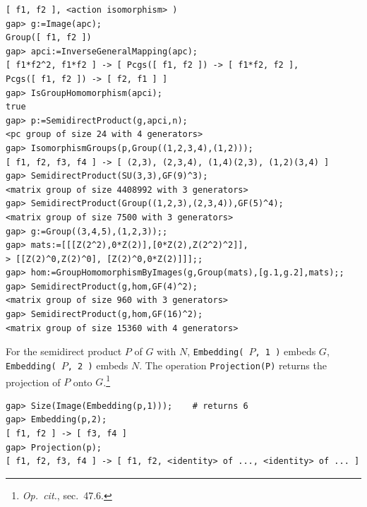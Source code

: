 \begin{itemize}
{\begin{verbatim}
[ f1, f2 ], <action isomorphism> )
gap> g:=Image(apc);
Group([ f1, f2 ])
gap> apci:=InverseGeneralMapping(apc);
[ f1*f2^2, f1*f2 ] -> [ Pcgs([ f1, f2 ]) -> [ f1*f2, f2 ],
Pcgs([ f1, f2 ]) -> [ f2, f1 ] ]
gap> IsGroupHomomorphism(apci);
true
gap> p:=SemidirectProduct(g,apci,n);
<pc group of size 24 with 4 generators>
gap> IsomorphismGroups(p,Group((1,2,3,4),(1,2)));
[ f1, f2, f3, f4 ] -> [ (2,3), (2,3,4), (1,4)(2,3), (1,2)(3,4) ]
gap> SemidirectProduct(SU(3,3),GF(9)^3);
<matrix group of size 4408992 with 3 generators>
gap> SemidirectProduct(Group((1,2,3),(2,3,4)),GF(5)^4);
<matrix group of size 7500 with 3 generators>
gap> g:=Group((3,4,5),(1,2,3));;
gap> mats:=[[[Z(2^2),0*Z(2)],[0*Z(2),Z(2^2)^2]],
> [[Z(2)^0,Z(2)^0], [Z(2)^0,0*Z(2)]]];;
gap> hom:=GroupHomomorphismByImages(g,Group(mats),[g.1,g.2],mats);;
gap> SemidirectProduct(g,hom,GF(4)^2);
<matrix group of size 960 with 3 generators>
gap> SemidirectProduct(g,hom,GF(16)^2);
<matrix group of size 15360 with 4 generators>
\end{verbatim}}
\noindent For the semidirect product $P$ of $G$ with $N$, {\tt Embedding( $P$, 1 )}
embeds $G$, {\tt Embedding( $P$, 2 )} embeds $N$. The operation {\tt Projection(P)}
returns the projection of $P$ onto $G$.\footnote{{\it Op.~cit.}, sec.~47.6.}
{\codesize
\begin{verbatim}
gap> Size(Image(Embedding(p,1)));    # returns 6
gap> Embedding(p,2);
[ f1, f2 ] -> [ f3, f4 ]
gap> Projection(p);
[ f1, f2, f3, f4 ] -> [ f1, f2, <identity> of ..., <identity> of ... ]

\end{verbatim}}

\end{itemize}
\subsectionspace

